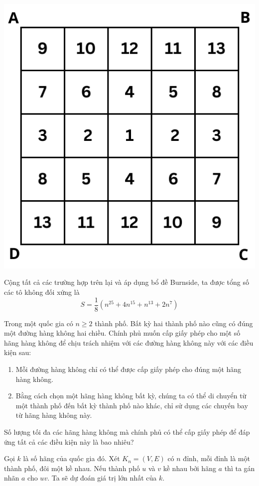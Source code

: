 \documentclass[11pt]{scrartcl}
\begin{document}
\begin{itemize}[label=, leftmargin=0em, itemsep=0.5em]
\begin{sol}
            \begin{center}
                \includegraphics[scale=0.57]{Image/tam.pdf}
            \end{center}

            Cộng tất cả các trường hợp trên lại và áp dụng bổ đề Burnside, ta được tổng số các tô không đối xứng là 
            \[
            S = \frac{1}{8} \left(n^{25} + 4n^{15} + n^{13} + 2n^7\right)
            \]
        \end{sol}
    \begin{bt} Trong một quốc gia có $n\geq 2$ thành phố. Bất kỳ hai thành phố nào cũng có đúng một đường hàng không hai chiều. Chính phủ muốn cấp giấy phép cho một số hãng hàng không để chịu trách nhiệm với các đường hàng không này với các điều kiện sau:
        \begin{enumerate}
            \item Mỗi đường hàng không chỉ có thể được cấp giấy phép cho đúng một hãng hàng không.
            \item Bằng cách chọn một hãng hàng không bất kỳ, chúng ta có thể di chuyển từ một thành phố đến bất kỳ thành phố nào khác, chỉ sử dụng các chuyến bay từ hãng hàng không này.
        \end{enumerate}
        Số lượng tối đa các hãng hàng không mà chính phủ có thể cấp giấy phép để đáp ứng tất cả các điều kiện này là bao nhiêu?
    \end{bt}
    \begin{sol}
        Gọi $k$ là số hãng của quốc gia đó. Xét $K_n = (V,E)$ có $n$ đỉnh, mỗi đỉnh là một thành phố, đôi một kề nhau. Nếu thành phố $u$ và $v$ kề nhau bởi hãng $a$ thì ta gán nhãn $a$ cho $uv$. Ta sẽ dự đoán giá trị lớn nhất của $k$.



\end{sol}
\end{itemize}
\end{document}
